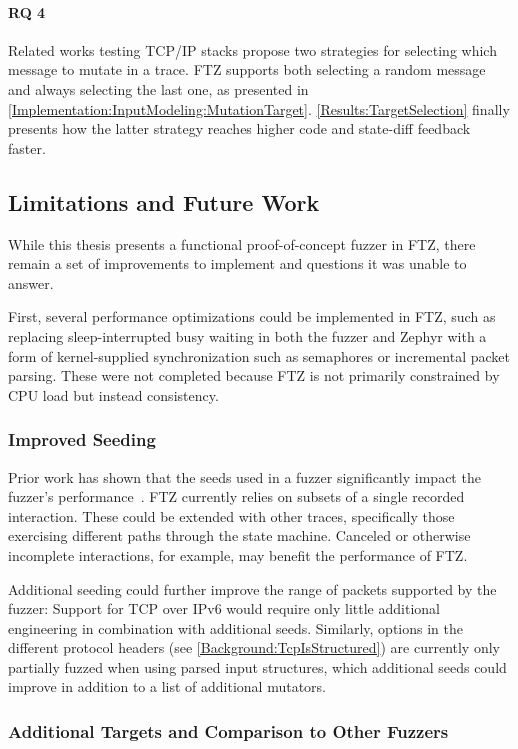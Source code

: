 \documentclass[twocolumn]{article}
\newcommand{\proj}{FTZ\xspace}
\let\savedCite=\cite
\renewcommand{\cite}{\unskip~\savedCite}
\begin{document}
\paragraph{RQ 4} Related works testing TCP/IP stacks propose two strategies for selecting which message to mutate in a trace. \proj supports both selecting a random message and always selecting the last one, as presented in \cref{Implementation:InputModeling:MutationTarget}. \cref{Results:TargetSelection} finally presents how the latter strategy reaches higher code and state-diff feedback faster.

\subsection{Limitations and Future Work}

While this thesis presents a functional proof-of-concept fuzzer in \proj, there remain a set of improvements to implement and questions it was unable to answer.

First, several performance optimizations could be implemented in \proj, such as replacing sleep-interrupted busy waiting in both the fuzzer and Zephyr with a form of kernel-supplied synchronization such as semaphores or incremental packet parsing. These were not completed because \proj is not primarily constrained by CPU load but instead consistency.

\subsubsection{Improved Seeding}

Prior work has shown that the seeds used in a fuzzer significantly impact the fuzzer's performance\cite{Seeding}. \proj currently relies on subsets of a single recorded interaction. These could be extended with other traces, specifically those exercising different paths through the state machine. Canceled or otherwise incomplete interactions, for example, may benefit the performance of \proj.

Additional seeding could further improve the range of packets supported by the fuzzer: Support for TCP over IPv6 would require only little additional engineering in combination with additional seeds. Similarly, options in the different protocol headers (see \cref{Background:TcpIsStructured}) are currently only partially fuzzed when using parsed input structures, which additional seeds could improve in addition to a list of additional mutators.

\subsubsection{Additional Targets and Comparison to Other Fuzzers}
\end{document}
